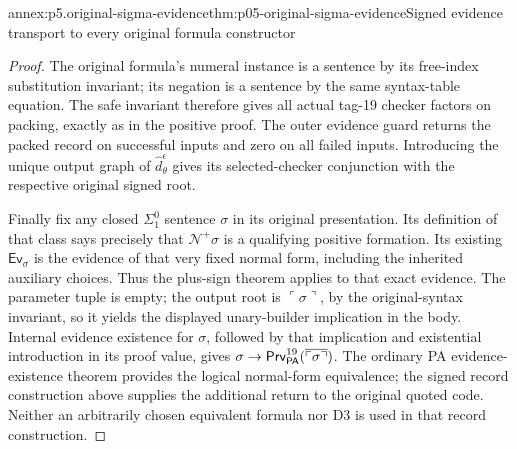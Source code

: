 \begin{annexitem}{annex:p5.original-sigma-evidence}{thm:p05-original-sigma-evidence}{Signed evidence transport to every original formula constructor}
\begin{proof}
The original formula's numeral instance is a sentence by its
free-index substitution invariant; its negation is a sentence
by the same syntax-table equation. The safe invariant therefore
gives all actual tag-19 checker factors on packing, exactly as
in the positive proof. The outer evidence guard returns the
packed record on successful inputs and zero on all failed inputs.
Introducing the unique output graph of
\(\widehat d_\theta^\epsilon\) gives its selected-checker
conjunction with the respective original signed root.

Finally fix any closed \(\Sigma^0_1\) sentence \(\sigma\)
in its original presentation. Its definition of that class says
precisely that \(\mathcal N^+\sigma\) is a qualifying positive
formation. Its existing \(\mathsf{Ev}_\sigma\) is the evidence
of that very fixed normal form, including the inherited auxiliary
choices. Thus the plus-sign theorem applies to that exact evidence.
The parameter tuple is empty; the output root is
\(\ulcorner\sigma\urcorner\), by the original-syntax invariant,
so it yields the displayed unary-builder implication in the body.
Internal evidence existence for \(\sigma\), followed by that
implication and existential introduction in its proof value,
gives \(\sigma\to\mathsf{Prv}^{19}_{\mathsf{PA}}
(\overline{\ulcorner\sigma\urcorner})\). The ordinary PA
evidence-existence theorem provides the logical normal-form
equivalence; the signed record construction above supplies the
additional return to the original quoted code. Neither an
arbitrarily chosen equivalent formula nor D3 is used in that
record construction.
\end{proof}
\end{annexitem}

